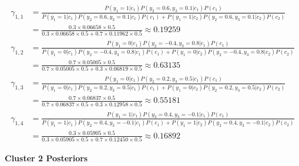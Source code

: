 \documentclass[12pt]{article}
\begin{document}
\begin{enumerate}[leftmargin=\labelsep]
        \vskip -0.5cm
        \begingroup
        \addtolength{\jot}{0.7em}
        \begin{align*}
          \gamma_{1,1} & = \frac{P(y_1=1|c_1)P(y_2=0.6,y_3=0.1|c_1)P(c_1)}{P(y_1=1|c_1)P(y_2=0.6,y_3=0.1|c_1)P(c_1) + P(y_1=1|c_2)P(y_2=0.6,y_3=0.1|c_2)P(c_2)}    \\
                       & = \frac{0.3 \times 0.06658 \times 0.5}{0.3 \times 0.06658 \times 0.5 + 0.7 \times 0.11962 \times 0.5} \approx 0.19259                     \\
          \gamma_{1,2} & = \frac{P(y_1=0|c_1)P(y_2=-0.4,y_3=0.8|c_1)P(c_1)}{P(y_1=0|c_1)P(y_2=-0.4,y_3=0.8|c_1)P(c_1) + P(y_1=0|c_2)P(y_2=-0.4,y_3=0.8|c_2)P(c_2)} \\
                       & = \frac{0.7 \times 0.05005 \times 0.5}{0.7 \times 0.05005 \times 0.5 + 0.3 \times 0.06819 \times 0.5} \approx 0.63135                     \\
          \gamma_{1,3} & = \frac{P(y_1=0|c_1)P(y_2=0.2,y_3=0.5|c_1)P(c_1)}{P(y_1=0|c_1)P(y_2=0.2,y_3=0.5|c_1)P(c_1) + P(y_1=0|c_2)P(y_2=0.2,y_3=0.5|c_2)P(c_2)}    \\
                       & = \frac{0.7 \times 0.06837 \times 0.5}{0.7 \times 0.06837 \times 0.5 + 0.3 \times 0.12958 \times 0.5} \approx 0.55181                     \\
          \gamma_{1,4} & = \frac{P(y_1=1|c_1)P(y_2=0.4,y_3=-0.1|c_1)P(c_1)}{P(y_1=1|c_1)P(y_2=0.4,y_3=-0.1|c_1)P(c_1) + P(y_1=1|c_2)P(y_2=0.4,y_3=-0.1|c_2)P(c_2)} \\
                       & = \frac{0.3 \times 0.05905 \times 0.5}{0.3 \times 0.05905 \times 0.5 + 0.7 \times 0.12450 \times 0.5} \approx 0.16892
        \end{align*}
        \endgroup

        \begin{center}
          \textbf{\colorbox{byellow}{Cluster 2 Posteriors}}
        \end{center}


\end{enumerate}
\end{document}
